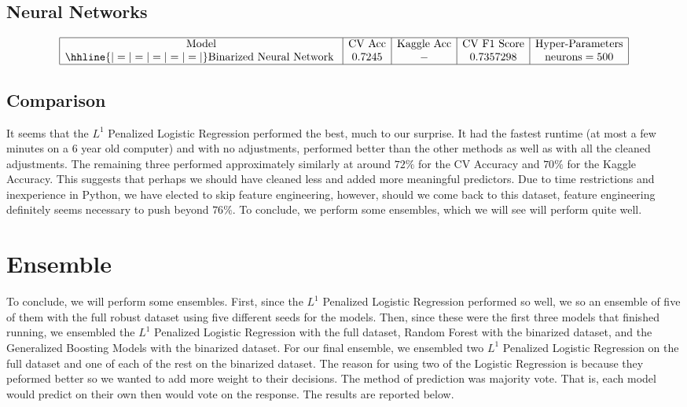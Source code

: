 \documentclass{article}
\begin{document}
\subsection{Neural Networks}
$$\begin{array}{|c|c|c|c|c|}
\hline
\text{Model} & \text{CV Acc} & \text{Kaggle Acc} & \text{CV F1 Score} & \text{Hyper-Parameters} \\
\hhline{|=|=|=|=|=|}
\text{Binarized Neural Network } & 0.7245 & - & 0.7357298 & \text{neurons} = 500 \\
\hline
\end{array}$$

\subsection{Comparison}
It seems that the $L^1$ Penalized Logistic Regression performed the best, much to our surprise. It had the fastest runtime (at most a few minutes on a 6 year old computer) and with no adjustments, performed better than the other methods as well as with all the cleaned adjustments. The remaining three performed approximately similarly at around $72\%$ for the CV Accuracy and $70\%$ for the Kaggle Accuracy. This suggests that perhaps we should have cleaned less and added more meaningful predictors. Due to time restrictions and inexperience in Python, we have elected to skip feature engineering, however, should we come back to this dataset, feature engineering definitely seems necessary to push beyond $76\%$. To conclude, we perform some ensembles, which we will see will perform quite well.

\section{Ensemble}
To conclude, we will perform some ensembles. First, since the $L^1$ Penalized Logistic Regression performed so well, we so an ensemble of five of them with the full robust dataset using five different seeds for the models. Then, since these were the first three models that finished running, we ensembled the $L^1$ Penalized Logistic Regression with the full dataset, Random Forest with the binarized dataset, and the Generalized Boosting Models with the binarized dataset. For our final ensemble, we ensembled two $L^1$ Penalized Logistic Regression on the full dataset and one of each of the rest on the binarized dataset. The reason for using two of the Logistic Regression is because they peformed better so we wanted to add more weight to their decisions. The method of prediction was majority vote. That is, each model would predict on their own then would vote on the response. The results are reported below.
\end{document}
